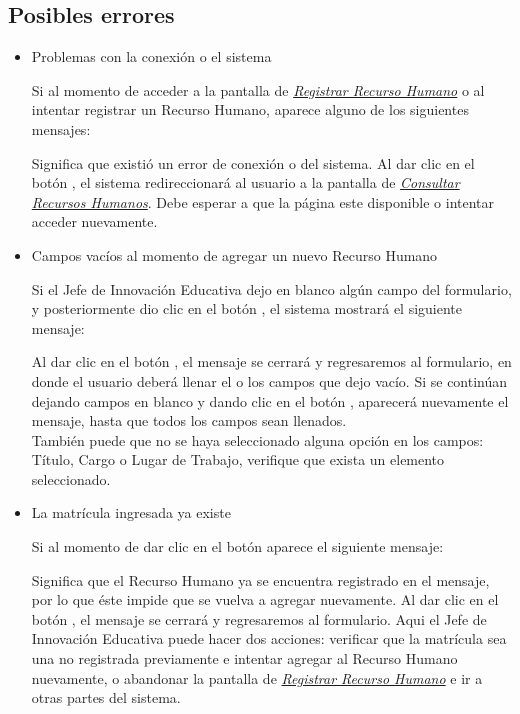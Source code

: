         \subsection{Posibles errores}
            \begin{itemize}
            	\item Problemas con la conexión o el sistema

                	Si al momento de acceder a la pantalla de \hyperlink{registrarrh}{\textit{Registrar Recurso Humano}} o al intentar registrar un Recurso Humano, aparece alguno de los siguientes mensajes:

                	Significa que existió un error de conexión o del sistema. Al dar clic en el botón , el sistema redireccionará al usuario a la pantalla de \hyperlink{consultarrh}{\textit{Consultar Recursos Humanos}}. Debe esperar a que la página este disponible o intentar acceder nuevamente.

            	\item Campos vacíos al momento de agregar un nuevo Recurso Humano

                	Si el Jefe de Innovación Educativa dejo en blanco algún campo del formulario, y posteriormente dio clic en el botón , el sistema mostrará el siguiente mensaje:

                	Al dar clic en el botón , el mensaje se cerrará y regresaremos al formulario, en donde el usuario deberá llenar el o los campos que dejo vacío. Si se continúan dejando campos en blanco y dando clic en el botón , aparecerá nuevamente el mensaje, hasta que todos los campos sean llenados.\\

                	También puede que no se haya seleccionado alguna opción en los campos: Título, Cargo o Lugar de Trabajo, verifique que exista un elemento seleccionado.

            	\item La matrícula ingresada ya existe

                	Si al momento de dar clic en el botón  aparece el siguiente mensaje:

                	Significa que el Recurso Humano ya se encuentra registrado en el mensaje, por lo que éste impide que se vuelva a agregar nuevamente. Al dar clic en el botón , el mensaje se cerrará y regresaremos al formulario. Aqui el Jefe de Innovación Educativa puede hacer dos acciones: verificar que la matrícula sea una no registrada previamente e intentar agregar al Recurso Humano nuevamente, o abandonar la pantalla de \hyperlink{registrarrh}{\textit{Registrar Recurso Humano}} e ir a otras partes del sistema.


\end{itemize}
